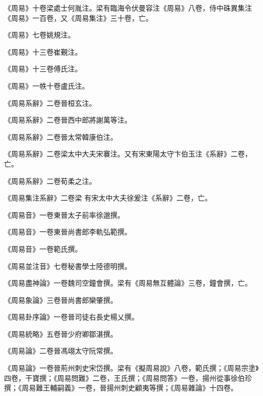\begin{pinyinscope}
 《周易》十卷梁處士何胤注。梁有臨海令伏曼容注《周易》八卷，侍中硃異集注《周易》一百卷，又《周易集注》三十卷，亡。



 《周易》七卷姚規注。



 《周易》十三卷崔覲注。



 《周易》十三卷傅氏注。



 《周易》一帙十卷盧氏注。



 《周易系辭》二卷晉桓玄注。



 《周易系辭》二卷晉西中郎將謝萬等注。



 《周易系辭》二卷晉太常韓康伯注。



 《周易系辭》二卷梁太中大夫宋褰注。又有宋東陽太守卞伯玉注《系辭》二卷，亡。



 《周易系辭》二卷荀柔之注。



 《周易集注系辭》二卷梁
 有宋太中大夫徐爰注《系辭》二卷，亡。



 《周易音》一卷東晉太子前率徐邈撰。



 《周易音》一卷東晉尚書郎李軌弘範撰。



 《周易音》一卷範氏撰。



 《周易並注音》七卷秘書學士陸德明撰。



 《周易盡神論》一卷魏司空鐘會撰。梁有《周易無互體論》三卷，鐘會撰，亡。



 《周易象論》三卷晉尚書郎欒肇撰。



 《周易卦序論》一卷晉司徒右長史楊乂撰。



 《周易統略》五卷晉少府卿鄒湛撰。



 《周易論》二卷晉馮翊太守阮常撰。



 《周易論》一卷晉荊州刺史宋岱撰。梁有《擬周易說》八卷，範氏撰；《周易宗塗》四卷，干寶撰；《周易問難》二卷，王氏撰；《周易問答》一卷，揚州從事徐伯珍撰；《周易難王輔嗣義》一卷，晉揚州刺史顧夷等撰；《周易雜論》十四卷。




\end{pinyinscope}
